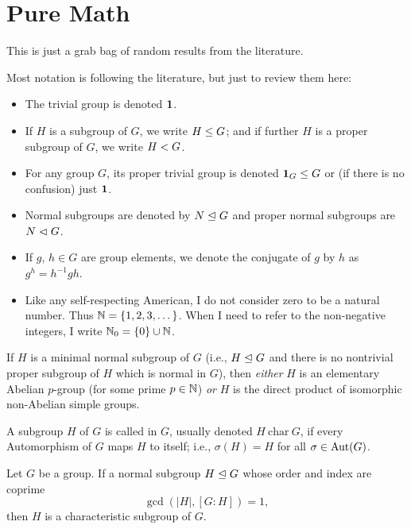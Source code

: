 \chapter{Pure Math}

\M
This is just a grab bag of random results from the literature.

 Most notation is following the literature, but just to
review them here:
\begin{itemize}%
\item The trivial group is denoted $\mathbf{1}$.
\item If $H$ is a subgroup of $G$, we write $H\leq G$; and if
  further $H$ is a proper subgroup of $G$, we write $H< G$.
\item For any group $G$, its proper trivial group is denoted
  $\mathbf{1}_{G}\leq G$ or (if there is no confusion) just
  $\mathbf{1}$.
\item Normal subgroups are denoted by $N\trianglelefteq G$ and proper
  normal subgroups are $N\mathrel{\lhd} G$.
\item If $g$, $h\in G$ are group elements, we denote the conjugate of $g$ by
$h$ as $g^{h}=h^{-1}gh$.
\item Like any self-respecting American, I do not consider zero to be a
natural number. Thus $\mathbb{N}=\{1,2,3,\dots\}$. When I need to refer to the
non-negative integers, I write $\mathbb{N}_{0}=\{0\}\cup\mathbb{N}$.
\end{itemize}

\begin{theorem}
  If $H$ is a minimal normal subgroup of $G$ (i.e., $H\trianglelefteq G$
  and there is no nontrivial proper subgroup of $H$ which is normal in
  $G$),
  then \emph{either} $H$ is an elementary Abelian $p$-group (for some
  prime $p\in\mathbb{N}$) \emph{or} $H$ is the direct product of isomorphic
  non-Abelian simple groups.
\end{theorem}

\begin{definition}
A subgroup $H$ of $G$ is called  in $G$, usually
denoted $H~\mathrm{char}~G$, if every Automorphism of $G$ maps $H$ to
itself; i.e., $\sigma(H)=H$ for all $\sigma\in\operatorname{Aut}(G)$.
\end{definition}

\begin{theorem}
Let $G$ be a group. If a normal subgroup $H\trianglelefteq G$ whose
order and index are coprime
\begin{equation*}
\gcd(|H|, [G:H])=1,
\end{equation*}
then $H$ is a characteristic subgroup of $G$.
\end{theorem}

